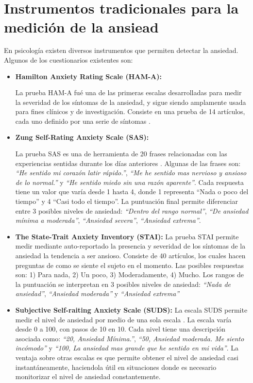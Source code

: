\section{Instrumentos tradicionales para la medici\'on de la ansiead}
        En psicolog\'ia existen diversos instrumentos que permiten detectar la ansiedad. Algunos de los cuestionarios existentes son:
        \begin{itemize}

		\item \textbf{Hamilton Anxiety Rating Scale (HAM-A):}

			La prueba HAM-A fu\'e una de las primeras escalas desarrolladas para medir la severidad de los s\'intomas de la ansiedad, y sigue siendo amplamente usada para fines cl\'inicos y de investigaci\'on. Consiste en una prueba de 14 art\'iculos, cada uno definido por una serie de s\'intomas \citep{PAPT467}.
		\item \textbf{Zung Self-Rating Anxiety Scale (SAS):}

			La prueba SAS es una de herramienta de 20 frases relacionadas con las experiencias sentidas durante los d\'ias anteriores \citep{Zung1971371}. Algunas de las frases son: \textit{``He sentido mi coraz\'on latir r\'apido.''}, \textit{``Me he sentido mas nervioso y ansioso de lo normal.''} y \textit{``He sentido miedo sin una raz\'on aparente''}. Cada respuesta tiene un valor que var\'ia desde 1 hasta 4, donde 1 representa ``Nada o poco del tiempo'' y 4 ``Casi todo el tiempo''. La puntuaci\'on final permite diferenciar entre 3 posibles niveles de ansiedad: \textit{``Dentro del rango normal''}, \textit{``De ansiedad m\'inima a moderada''}, \textit{``Ansiedad severa''}, \textit{``Ansiedad extrema''}.
		\item \textbf{The State-Trait Anxiety Inventory (STAI):}
			La prueba STAI permite medir mediante auto-reportado la presencia y severidad de los s\'intomas de la ansiedad la tendencia a ser ansioso\citep{julian2011measures}. Consiste de 40 art\'iculos, los cuales hacen preguntas de como se siente el sujeto en el momento. Las posibles respuestas son: 1) Para nada, 2) Un poco, 3) Moderadamente, 4) Mucho. Los rangos de la puntuaci\'on se interpretan en 3 posibles niveles de ansiedad: \textit{``Nada de ansiedad''}, \textit{``Ansiedad moderada''} y \textit{``Ansiedad extrema''}

		\item \textbf{Subjective Self-raiting Anxiety Scale (SUDS):}
			La escala SUDS permite medir el nivel de ansiedad por medio de una sola escala \citep{wolpe1973practice}. La escala var\'ia desde 0 a 100, con pasos de 10 en 10. Cada nivel tiene una descripci\'on asociada como: \textit{``20, Ansiedad M\'inima.''}, \textit{``50, Ansiedad moderada. Me siento inc\'omodo''} y \textit{``100, La ansiedad mas grande que he sentido en mi vida''}. La ventaja sobre otras escalas es que permite obtener el nivel de ansiedad casi instant\'aneamente, haciendola \'util en situaciones donde es necesario monitorizar el nivel de ansiedad constantemente.
        \end{itemize}



